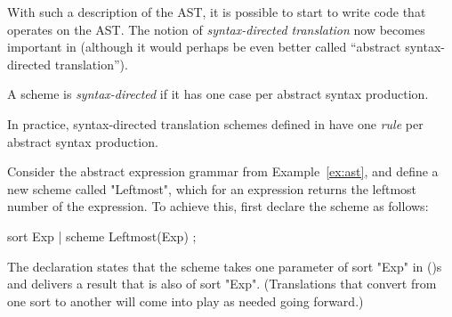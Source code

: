 \documentclass[11pt]{article} %
\begin{document}
With such a description of the AST, it is possible to start to write code that operates on the
AST. The notion of \emph{syntax-directed translation} now becomes important in (although it would
perhaps be even better called ``abstract syntax-directed translation'').

\begin{definition}
  A scheme is \emph{syntax-directed} if it has one case per abstract syntax production.
\end{definition}

In practice, syntax-directed translation schemes defined in \HAX have one \emph{rule} per abstract
syntax production.

\begin{example}\label{ex:leftmost}
  Consider the abstract expression grammar from Example~\ref{ex:ast}, and define a new scheme called
  "Leftmost", which for an expression returns the leftmost number of the expression. To achieve
  this, first declare the scheme as follows:
  \begin{hacs}[xleftmargin=\parindent,xrightmargin=\parindent]
sort Exp | scheme Leftmost(Exp) ;
  \end{hacs}
  The declaration states that the scheme takes one parameter of sort "Exp" in ()s and delivers a
  result that is also of sort "Exp". (Translations that convert from one sort to another will come
  into play as needed going forward.)


\end{example}
\end{document}
